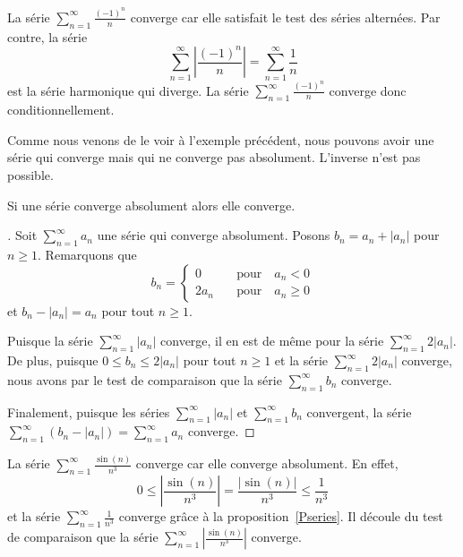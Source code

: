 {\begin{egg}
La série $\displaystyle \sum_{n=1}^\infty \frac{(-1)^n}{n}$ converge
car elle satisfait le test des séries alternées.  Par contre, la série
\[
\sum_{n=1}^\infty \left|\frac{(-1)^n}{n}\right| =
\sum_{n=1}^\infty \frac{1}{n}
\]
est la série harmonique qui diverge.  La série
$\displaystyle \sum_{n=1}^\infty \frac{(-1)^n}{n}$ converge donc
conditionnellement.
\end{egg}

Comme nous venons de le voir à l'exemple précédent, nous pouvons avoir une
série qui converge mais qui ne converge pas absolument.  L'inverse
n'est pas possible.

\begin{focus}{\thm}
Si une série converge absolument alors elle converge.
\end{focus}

\begin{proof}[\theory]
Soit $\displaystyle \sum_{n=1}^\infty a_n$ une série qui converge
absolument.  Posons $b_n = a_n + |a_n|$ pour $n\geq 1$.
Remarquons que
\[
b_n = \begin{cases}
0 & \quad \text{pour}\quad  a_n<0 \\
2 a_n & \quad \text{pour}\quad  a_n \geq 0
\end{cases}
\]
et $b_n - |a_n| = a_n$ pour tout $n\geq 1$.

Puisque la série $\displaystyle \sum_{n=1}^\infty |a_n|$ converge, il
en est de même pour la
série $\displaystyle \sum_{n=1}^\infty 2 |a_n|$.  De 
plus, puisque $0 \leq b_n \leq 2 |a_n|$ pour tout $n\geq 1$ et la
série $\displaystyle \sum_{n=1}^\infty 2 |a_n|$ converge, nous avons par le
test de comparaison que la série $\displaystyle \sum_{n=1}^\infty b_n$
converge.

Finalement, puisque les séries $\displaystyle \sum_{n=1}^\infty |a_n|$
et $\displaystyle \sum_{n=1}^\infty b_n$ convergent, la série
$\displaystyle \sum_{n=1}^\infty (b_n - |a_n|) = \sum_{n=1}^\infty a_n$
converge.
\end{proof}

\begin{egg}
La série $\displaystyle \sum_{n=1}^\infty \frac{\sin(n)}{n^3}$
converge car elle converge absolument.  En effet,
\[
0 \leq \left| \frac{\sin(n)}{n^3} \right|
= \frac{|\sin(n)|}{n^3} \leq \frac{1}{n^3}
\]
et la série $\displaystyle \sum_{n=1}^\infty \frac{1}{n^3}$ converge
grâce à la proposition~\ref{Pseries}.  Il découle du test de comparaison
que la série
$\displaystyle \sum_{n=1}^\infty \left| \frac{\sin(n)}{n^3} \right|$
converge.
\end{egg}

}
